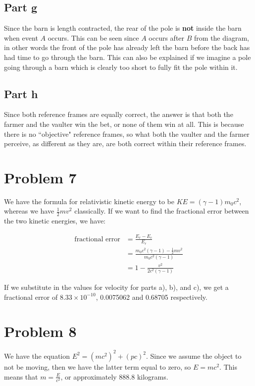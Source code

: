 \documentclass{article}
\theoremstyle{definition}
\numberwithin{equation}{section}
\numberwithin{definition}{section}
\begin{document}
\subsection{Part g}

Since the barn is length contracted, the rear of the pole is \textbf{not} inside the barn when event $A$ occurs. This can be seen since $A$ occurs after $B$ from the diagram, in other words the front of the pole has already left the barn before the back has had time to go through the barn. This can also be explained if we imagine a pole going through a barn which is clearly too short to fully fit the pole within it.

\subsection{Part h}

Since both reference frames are equally correct, the answer is that both the farmer and the vaulter win the bet, or none of them win at all. This is because there is no ``objective" reference frames, so what both the vaulter and the farmer perceive, as different as they are, are both correct within their reference frames.

\section{Problem 7}

We have the formula for relativistic kinetic energy to be $KE = (\gamma -1)m_0c^2$, whereas we have $\frac{1}{2} mv^2$ classically. If we want to find the fractional error between the two kinetic energies, we have: 

\begin{align*}
	\text{fractional error} &= \frac{E_r - E_c}{E_r}\\
	&= \frac{m_0c^2(\gamma-1) - \frac{1}{2}mv^2}{m_0c^2(\gamma-1)}\\
	&= 1 - \frac{v^2}{2c^2(\gamma-1)}
\end{align*}
	
	If we substitute in the values for velocity for parts a), b), and c), we get a fractional error of $8.33 \times 10^{-10}$, 0.0075062 and 0.68705 respectively.
	
	
	\section{Problem 8}
	
	We have the equation $E^2 = (mc^2)^2 + (pc)^2$. Since we assume the object to not be moving, then we have the latter term equal to zero, so $E = mc^2$. This means that $m = \frac{E}{c^2}$, or approximately 888.8 kilograms.
	
\end{document}
